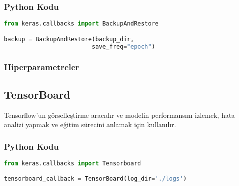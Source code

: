 \subsubsection{Python Kodu}

\begin{lstlisting}[language=Python]
from keras.callbacks import BackupAndRestore

backup = BackupAndRestore(backup_dir,
						 save_freq="epoch")
\end{lstlisting}

\subsubsection{Hiperparametreler}
\begin{table}[h]
\centering
{\scriptsize\renewcommand{\arraystretch}{0.4}
{}}
\end{table}

\newpage

\subsection{TensorBoard}
Tensorflow'un görselleştirme aracıdır ve modelin performansını izlemek, hata analizi yapmak ve eğitim sürecini anlamak için kullanılır.

\subsubsection{Python Kodu}

\begin{lstlisting}[language=Python]
from keras.callbacks import Tensorboard

tensorboard_callback = TensorBoard(log_dir='./logs')
\end{lstlisting}

